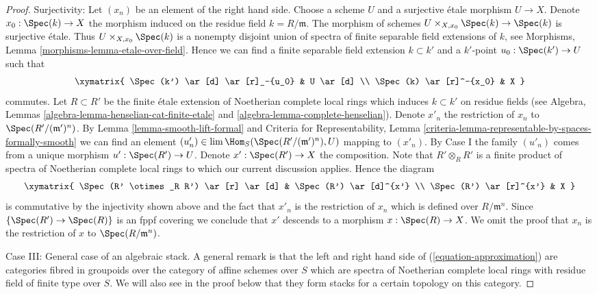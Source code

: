 \begin{proof}
\medskip\noindent
Surjectivity: Let $(x_n)$ be an element of the right hand side.
Choose a scheme $U$ and a surjective \'etale morphism $U \to X$. 
Denote $x_0 : \Spec(k) \to X$ the morphism induced on the residue field
$k = R/\mathfrak m$. The morphism of schemes
$U \times_{X, x_0} \Spec(k) \to \Spec(k)$ is surjective \'etale.
Thus $U \times_{X, x_0} \Spec(k)$ is a nonempty disjoint union of spectra
of finite separable field extensions of $k$, see
Morphisms, Lemma \ref{morphisms-lemma-etale-over-field}.
Hence we can find a finite separable field extension $k \subset k'$
and a $k'$-point $u_0 : \Spec(k') \to U$ such that
$$
\xymatrix{
\Spec(k') \ar[d] \ar[r]_-{u_0} & U \ar[d] \\
\Spec(k) \ar[r]^-{x_0} & X
}
$$
commutes. Let $R \subset R'$ be the finite \'etale extension of Noetherian
complete local rings which induces $k \subset k'$ on residue fields
(see Algebra, Lemmas \ref{algebra-lemma-henselian-cat-finite-etale} and
\ref{algebra-lemma-complete-henselian}). Denote $x'_n$ the restriction
of $x_n$ to $\Spec(R'/(\mathfrak m')^n)$. By
Lemma \ref{lemma-smooth-lift-formal}
and
Criteria for Representability, Lemma
\ref{criteria-lemma-representable-by-spaces-formally-smooth}
we can find an element
$(u'_n) \in \lim \Hom_S(\Spec(R'/(\mathfrak m')^n), U)$
mapping to $(x'_n)$. By Case I the family $(u'_n)$ comes from a unique
morphism $u' : \Spec(R') \to U$. Denote $x' : \Spec(R') \to X$ the
composition. Note that $R' \otimes_R R'$ is a finite product of spectra of
Noetherian complete local rings to which our current discussion applies.
Hence the diagram
$$
\xymatrix{
\Spec(R' \otimes_R R') \ar[r] \ar[d] & \Spec(R') \ar[d]^{x'} \\
\Spec(R') \ar[r]^{x'} & X
}
$$
is commutative by the injectivity shown above and the fact that
$x'_n$ is the restriction of $x_n$ which is defined over $R/\mathfrak m^n$.
Since $\{\Spec(R') \to \Spec(R)\}$ is an fppf covering we conclude
that $x'$ descends to a morphism $x : \Spec(R) \to X$.
We omit the proof that $x_n$ is the restriction of $x$ to
$\Spec(R/\mathfrak m^n)$.

\medskip\noindent
Case III: General case of an algebraic stack. A general remark is that
the left and right hand side of (\ref{equation-approximation}) are
categories fibred in groupoids over the category of affine schemes
over $S$ which are spectra of Noetherian complete local rings
with residue field of finite type over $S$. We will also see in the
proof below that they form stacks for a certain topology on this
category.


\end{proof}
